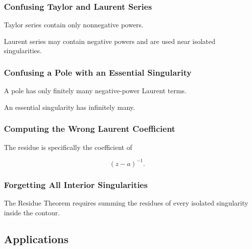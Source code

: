 \subsubsection{Confusing Taylor and Laurent Series}

Taylor series contain only nonnegative powers.

Laurent series may contain negative powers and are used near isolated
singularities.

\subsubsection{Confusing a Pole with an Essential Singularity}

A pole has only finitely many negative-power Laurent terms.

An essential singularity has infinitely many.

\subsubsection{Computing the Wrong Laurent Coefficient}

The residue is specifically the coefficient of

\[
\boxed{
(z-a)^{-1}.
}
\]

\subsubsection{Forgetting All Interior Singularities}

The Residue Theorem requires summing the residues of every isolated
singularity inside the contour.

\subsection{Applications}
\label{subsec:complex-analysis-applications}

